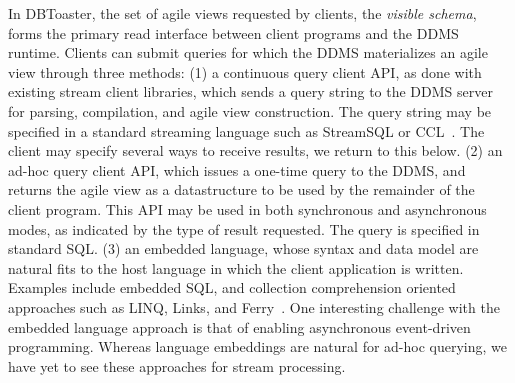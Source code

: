 In DBToaster, the set of agile views requested by clients, the \textit{visible
schema}, forms the primary read interface between client programs and the DDMS
runtime. Clients can submit queries for which the DDMS materializes an agile
view through three methods:
(1) a continuous query client API, as done with existing stream client
libraries, which sends a query string to the DDMS server for parsing,
compilation, and agile view construction. The query string may be specified in a
standard streaming language such as StreamSQL or CCL~\cite{jain-pvldb:08}. The
client may specify several ways to receive results, we return to this below.
(2) an ad-hoc query client API, which issues a one-time query to the
DDMS, and returns the agile view as a datastructure to be used by the remainder
of the client program. This API may be used in both synchronous and
asynchronous modes, as indicated by the type of result requested. The query is
specified in standard SQL.
(3) an embedded language, whose syntax and data model are natural fits to the
host language in which the client application is written. Examples include
embedded SQL, and collection comprehension oriented approaches such as LINQ,
Links, and Ferry~\cite{meijer-sigmod:06,cooper-fmco:06,grust-sigmod:09}.
One interesting challenge with the embedded language approach is that of
enabling asynchronous event-driven programming. Whereas language embeddings
are natural for ad-hoc querying, we have yet to see these approaches
for stream processing.

